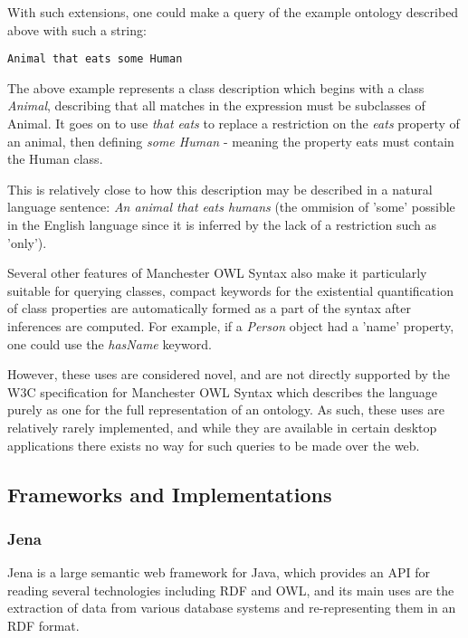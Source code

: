 \documentclass{article}
\begin{document}
With such extensions, one could make a query of the example ontology described
above with such a string:

\begin{lstlisting}
Animal that eats some Human
\end{lstlisting}

The above example represents a class description which begins with a class
\emph{Animal}, describing that all matches in the expression must be subclasses
of Animal. It goes on to use \emph{that eats} to replace a restriction on the
\emph{eats} property of an animal, then defining \emph{some Human} - meaning the
property eats must contain the Human class.

This is relatively close to how this description may be described in a natural
language sentence: \emph{An animal that eats humans} (the ommision of 'some'
possible in the English language since it is inferred by the lack of a
restriction such as 'only').

Several other features of Manchester OWL Syntax also make it particularly
suitable for querying classes, compact keywords for the existential quantification 
of class properties are automatically formed as a part of the syntax after
inferences are computed. For example, if a \emph{Person} object had a 'name'
property, one could use the \emph{hasName} keyword.

However, these uses are considered novel, and are not directly supported by the W3C
specification for Manchester OWL Syntax which describes the language purely as
one for the full representation of an ontology. As such, these uses are relatively rarely
implemented, and while they are available in certain desktop applications there
exists no way for such queries to be made over the web.

\subsection{Frameworks and Implementations} 

\subsubsection{Jena}

Jena is a large semantic web framework for Java, which provides an API for
reading several technologies including RDF and OWL, and its main uses are
the extraction of data from various database systems and re-representing them in
an RDF format. 
\end{document}
